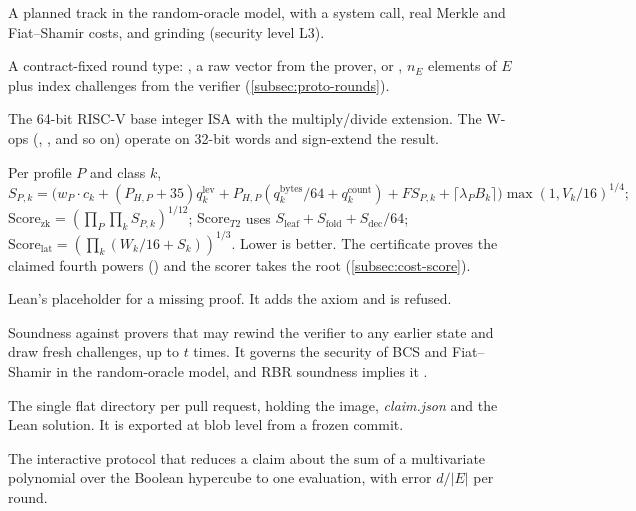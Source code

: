 \begin{description}[leftmargin=0pt,itemsep=2pt,parsep=0pt,font=\normalfont\bfseries]
\item[ROM track.] A planned track in the random-oracle model, with a  system call, real
  Merkle and Fiat--Shamir costs, and grinding (security level L3).

\item[Round shape.] A contract-fixed round type: , a raw vector
   from the prover, or , $n_E$ elements of $E$
  plus index challenges from the verifier (\cref{subsec:proto-rounds}).

\item[RV64IM; W-ops.] The 64-bit RISC-V base integer ISA with the multiply/divide extension. The
  W-ops (, ,  and so on) operate on 32-bit words and sign-extend
  the result.

\item[Score.] Per profile $P$ and class $k$,
  \[S_{P,k}=\bigl(w_P\cdot c_k+(P_{H,P}+35)q^{\mathrm{lev}}_k+P_{H,P}(q^{\mathrm{bytes}}_k/64+q^{\mathrm{count}}_k)
  +\mathit{FS}_{P,k}+\lceil\lambda_PB_k\rceil\bigr)\max(1,V_k/16)^{1/4};\]
  $\mathrm{Score}_{\mathrm{zk}}=(\prod_P\prod_kS_{P,k})^{1/12}$;
  $\mathrm{Score}_{T2}$ uses $S_{\mathrm{leaf}}+S_{\mathrm{fold}}+S_{\mathrm{dec}}/64$;
  $\mathrm{Score}_{\mathrm{lat}}=(\prod_k(W_k/16+S_k))^{1/3}$. Lower is better. The certificate
  proves the claimed fourth powers () and the scorer takes the root
  (\cref{subsec:cost-score}).

\item[sorry.] Lean's placeholder for a missing proof. It adds the axiom  and is
  refused.

\item[State-restoration soundness.] Soundness against provers that may rewind the verifier to any
  earlier state and draw fresh challenges, up to $t$ times. It governs the security of BCS and
  Fiat--Shamir in the random-oracle model, and RBR soundness implies it \cite{CY24-Book,Hol19}.

\item[Submission root.] The single flat directory per pull request, holding the image,
  \emph{claim.json} and the Lean solution. It is exported at blob level from a frozen commit.

\item[Sumcheck.] The interactive protocol that reduces a claim about the sum of a multivariate
  polynomial over the Boolean hypercube to one evaluation, with error $d/|E|$ per round.


\end{description}
